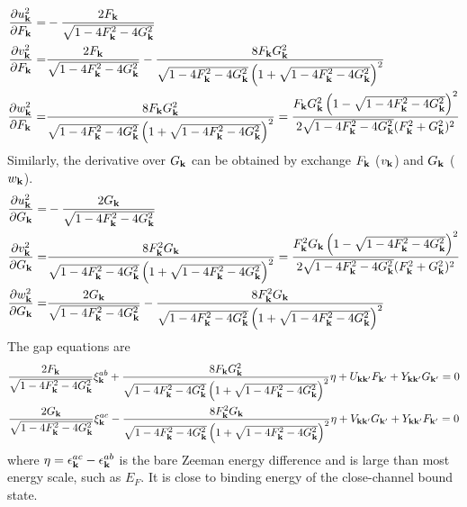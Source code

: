 \begin{equation}
\begin{split}
\frac{\partial{u_{\ensuremath{\mathbf{k}}}^2}}{\partial{F_{\ensuremath{\mathbf{k}}}}}=&-\frac{2 F_{\mathbf{k}}}{\sqrt{1-4 F_{\mathbf{k}}^2-4 G_{\mathbf{k}}^2}}\\
\frac{\partial{v_{\ensuremath{\mathbf{k}}}^2}}{\partial{F_{\ensuremath{\mathbf{k}}}}}=&\frac{2 F_{\mathbf{k}}}{\sqrt{1-4 F_{\mathbf{k}}^2-4 G_{\mathbf{k}}^2}}-\frac{8 F_{\mathbf{k}} G_{\mathbf{k}}^2}{\sqrt{1-4 F_{\mathbf{k}}^2-4 G_{\mathbf{k}}^2} \left(1+\sqrt{1-4 F_{\mathbf{k}}^2-4 G_{\mathbf{k}}^2}\right)^2}\\
\frac{\partial{w_{\ensuremath{\mathbf{k}}}^2}}{\partial{F_{\ensuremath{\mathbf{k}}}}}=&\frac{8 F_{\mathbf{k}} G_{\mathbf{k}}^2}{\sqrt{1-4 F_{\mathbf{k}}^2-4 G_{\mathbf{k}}^2} \left(1+\sqrt{1-4 F_{\mathbf{k}}^2-4 G_{\mathbf{k}}^2}\right)^2}
=\frac{F_{\mathbf{k}} G_{\mathbf{k}}^2 \left(1-\sqrt{1-4 F_{\mathbf{k}}^2-4 G_{\mathbf{k}}^2}\right)^2}{2\sqrt{1-4 F_{\mathbf{k}}^2-4 G_{\mathbf{k}}^2} (F_{\mathbf{k}}^2 + G_{\mathbf{k}}^2)^2}
\end{split}
\end{equation}
Similarly, the derivative over $G_{\mathbf{k}}$ can be obtained by exchange $F_{\mathbf{k}}$ ($v_{\mathbf{k}}$) and $G_{\mathbf{k}}$ ($w_{\mathbf{k}}$).
\begin{equation}
\begin{split}
\frac{\partial{u_{\ensuremath{\mathbf{k}}}^2}}{\partial{G_{\ensuremath{\mathbf{k}}}}}=&-\frac{2 G_{\mathbf{k}}}{\sqrt{1-4 F_{\mathbf{k}}^2-4 G_{\mathbf{k}}^2}}\\
\frac{\partial{v_{\ensuremath{\mathbf{k}}}^2}}{\partial{G_{\ensuremath{\mathbf{k}}}}}=&\frac{8 F_{\mathbf{k}} ^{2}G_{\mathbf{k}}}{\sqrt{1-4 F_{\mathbf{k}}^2-4 G_{\mathbf{k}}^2} \left(1+\sqrt{1-4 F_{\mathbf{k}}^2-4 G_{\mathbf{k}}^2}\right)^2}
=\frac{F_{\mathbf{k}}^{2}G_{\mathbf{k}} \left(1-\sqrt{1-4 F_{\mathbf{k}}^2-4 G_{\mathbf{k}}^2}\right)^2}{2\sqrt{1-4 F_{\mathbf{k}}^2-4 G_{\mathbf{k}}^2} (F_{\mathbf{k}}^2 + G_{\mathbf{k}}^2)^2}\\
\frac{\partial{w_{\ensuremath{\mathbf{k}}}^2}}{\partial{G_{\ensuremath{\mathbf{k}}}}}=&\frac{2 G_{\mathbf{k}}}{\sqrt{1-4 F_{\mathbf{k}}^2-4 G_{\mathbf{k}}^2}}-\frac{8 F_{\mathbf{k}} ^{2}G_{\mathbf{k}}}{\sqrt{1-4 F_{\mathbf{k}}^2-4 G_{\mathbf{k}}^2} \left(1+\sqrt{1-4 F_{\mathbf{k}}^2-4 G_{\mathbf{k}}^2}\right)^2}
\end{split}
\end{equation}
The gap equations are 
\begin{subequations}\label{eq:20100909:fullgap}
\begin{gather}
\frac{2F_{\mathbf{k}}}{\sqrt{1-4 F_{\mathbf{k}}^2-4 G_{\mathbf{k}}^2}} \xi^{ab}_{\mathbf{k}}+\frac{8 F_{\mathbf{k}} G_{\mathbf{k}}^2}{\sqrt{1-4 F_{\mathbf{k}}^2-4 G_{\mathbf{k}}^2} \left(1+\sqrt{1-4 F_{\mathbf{k}}^2-4 G_{\mathbf{k}}^2}\right)^2}\eta+U_{\mathbf{k}\mathbf{k}'}F_{\mathbf{k}'}+Y_{\mathbf{k}\mathbf{k}'}G_{\mathbf{k}'}=0
\label{eq:20100909:fullgapa}\\
\frac{2G_{\mathbf{k}}}{\sqrt{1-4 F_{\mathbf{k}}^2-4 G_{\mathbf{k}}^2}} \xi^{ac}_{\mathbf{k}}-\frac{8 F_{\mathbf{k}}^{2} G_{\mathbf{k}}}{\sqrt{1-4 F_{\mathbf{k}}^2-4 G_{\mathbf{k}}^2} \left(1+\sqrt{1-4 F_{\mathbf{k}}^2-4 G_{\mathbf{k}}^2}\right)^2}\eta+V_{\mathbf{k}\mathbf{k}'}G_{\mathbf{k}'}+Y_{\mathbf{k}\mathbf{k}'}F_{\mathbf{k}'}=0
\label{eq:20100909:fullgapb}
\end{gather}
\end{subequations}
where $\eta=\epsilon^{ac}_{\mathbf{k}}-\epsilon^{ab}_{\mathbf{k}}$ is the bare Zeeman energy difference and is large than most energy scale, such as $E_{F}$.  It is close to  binding energy of the close-channel bound state.   

